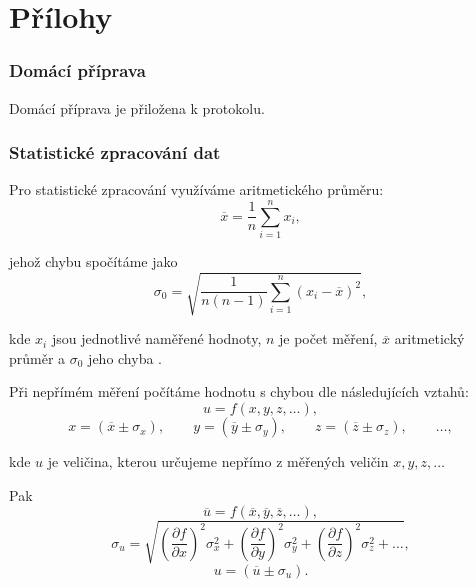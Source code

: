 \documentclass[english]{article}
\begin{document}
\part*{Přílohy}

\section{Domácí příprava}
	Domácí příprava je přiložena k protokolu.
\section{Statistické zpracování dat}

	Pro statistické zpracování využíváme aritmetického průměru:
	\begin{equation} \label{eq:aritmeticky_prumer}
	\overline{x} = \frac{1}{n}\sum\limits_{i=1}^{n}x_i,
	\end{equation}
%
%	
	
	
	jehož chybu spočítáme jako 
	\begin{equation} \label{eq:chyba_aritmetickeho_prumeru}
	\sigma_0 = \sqrt{\frac{1}{n(n-1)} \sum\limits_{i=1}^{n}\left( x_i - \overline{x} \right)^2 },
	\end{equation}
	
	kde $ x_i $ jsou jednotlivé naměřené hodnoty, $ n $ je počet měření, $ \overline{x} $ aritmetický průměr a $ \sigma_0 $ jeho chyba \cite{bib:chyby}.
	
Při nepřímém měření počítáme hodnotu s chybou dle následujících vztahů:
	\begin{equation}
	u = f(x, y, z, \ldots),
	\end{equation}
	\begin{displaymath}
	x = (\overline{x} \pm \sigma_x), \qquad
	y = (\overline{y} \pm \sigma_y), \qquad
	z = (\overline{z} \pm \sigma_z), \qquad
	\ldots,
	\end{displaymath}
	
	kde $ u $ je veličina, kterou určujeme nepřímo z měřených veličin $ x, y, z, \ldots $ 
	
	Pak
	\begin{displaymath}
	\overline{u} = f(\overline{x}, \overline{y}, \overline{z}, \ldots),
	\end{displaymath}
	\begin{equation}\label{eq:chyba_neprime_mereni}
	\sigma_u = \sqrt{\left( \frac{\partial f}{\partial x} \right)^2 \sigma^2_x + \left( \frac{\partial f}{\partial y} \right)^2 \sigma^2_y + \left( \frac{\partial f}{\partial z} \right)^2 \sigma^2_z + \ldots},
	\end{equation}
	\begin{displaymath}
	u = (\overline{u} \pm \sigma_ u).
	\end{displaymath}
\end{document}
